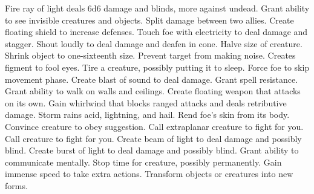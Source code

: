     {Fire ray of light deals 6d6 damage and blinds, more against undead.}
    {Grant ability to see invisible creatures and objects.}
    {Split damage between two allies.}
    {Create floating shield to increase defenses.}
    {Touch foe with electricity to deal damage and stagger.}
    {Shout loudly to deal damage and deafen in cone.}
    {Halve size of creature.}
    {Shrink object to one-sixteenth size.}
    {Prevent target from making noise.}
    {Creates figment to fool eyes.}
    {Tire a creature, possibly putting it to sleep.}
    {Force foe to skip movement phase.}
    {Create blast of sound to deal damage.}
    {Grant spell resistance.}
    {Grant ability to walk on walls and ceilings.}
    {Create floating weapon that attacks on its own.}
    {Gain whirlwind that blocks ranged attacks and deals retributive damage.}
    {Storm rains acid, lightning, and hail.}
    {Rend foe's skin from its body.}
    {Convince creature to obey suggestion.}
    {Call extraplanar creature to fight for you.}
    {Call creature to fight for you.}
    {Create beam of light to deal damage and possibly blind.}
    {Create burst of light to deal damage and possibly blind.}
    {Grant ability to communicate mentally.}
    {Stop time for creature, possibly permanently.}
    {Gain immense speed to take extra actions.}
    {Transform objects or creatures into new forms.}
